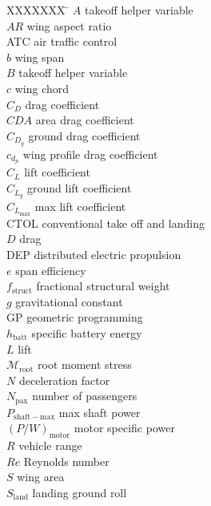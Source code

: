 \documentclass[]{aiaa-tc}%
\begin{document}
\begin{multicols}{2}
\small

\begin{tabbing}
  XXXXXXX \= \kill%
$A$ \> takeoff helper variable \\
$AR$ \> wing aspect ratio \\
ATC \> air traffic control \\
$b$ \> wing span \\ %
$B$ \> takeoff helper variable \\
$c$ \> wing chord \\ %
$C_D$ \> drag coefficient \\
$CDA$ \> area drag coefficient \\
$C_{D_g}$ \> ground drag coefficient \\
$c_{d_p}$ \> wing profile drag coefficient \\
$C_L$ \> lift coefficient \\
$C_{L_g}$ \> ground lift coefficient \\
$C_{L_{\mathrm{max}}}$ \> max lift coefficient \\
CTOL \> conventional take off and landing \\
$D$ \> drag \\
DEP \> distributed electric propulsion \\
$e$ \> span efficiency \\
$f_{\mathrm{struct}}$ \> fractional structural weight \\
$g$ \> gravitational constant \\
GP \> geometric programming \\
$h_{\mathrm{batt}}$ \> specific battery energy \\
$L$ \> lift \\
$\mathcal{M}_{\mathrm{root}}$ \> root moment stress \\
$N$ \> deceleration factor \\
$N_{\mathrm{pax}}$ \> number of passengers \\
$P_{\mathrm{shaft-max}}$ \> max shaft power \\
$(P/W)_{\mathrm{motor}}$ \> motor specific power \\
$R$ \> vehicle range \\
$Re$ \> Reynolds number \\
$S$ \> wing area \\
$S_{\mathrm{land}}$ \> landing ground roll \\

\end{tabbing}
\end{multicols}
\end{document}
